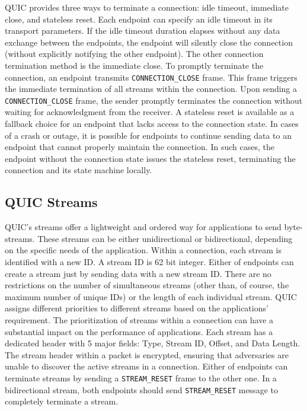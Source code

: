 QUIC provides three ways to terminate a connection: idle timeout, immediate close, and stateless reset.
Each endpoint can specify an idle timeout in its transport parameters.
If the idle timeout duration elapses without any data exchange between the endpoints, the endpoint will silently close the connection (\ie without explicitly notifying the other endpoint). 
The other connection termination method is the immediate close. 
To promptly terminate the connection, an endpoint transmits \texttt{CONNECTION\_CLOSE} frame. 
This frame triggers the immediate termination of all streams within the connection.
Upon sending a \texttt{CONNECTION\_CLOSE} frame, the sender promptly terminates the connection without waiting for acknowledgment from the receiver.
A stateless reset is available as a fallback choice for an endpoint that lacks access to the connection state.
In cases of a crash or outage, it is possible for endpoints to continue sending data to an endpoint that cannot properly maintain the connection.
In such cases, the endpoint without the connection state issues the stateless reset, terminating the connection and its state machine locally.




\subsection{QUIC Streams}
QUIC's streams offer a lightweight and ordered way for applications to send byte-streams.
These streams can be either unidirectional or bidirectional, depending on the specific needs of the application.
Within a connection, each stream is identified with a new ID.
A stream ID is 62 bit integer.
Either of endpoints can create a stream just by sending data with a new stream ID. 
There are no restrictions on the number of simultaneous streams (other than, of course, the maximum number of unique IDs) or the length of each individual stream.
QUIC assigns different priorities to different streams based on the applications' requirement.
The prioritization of streams within a connection can have a substantial impact on the performance of applications.
Each stream has a dedicated header with 5 major fields: Type, Stream ID, Offset, and Data Length.
The stream header within a packet is encrypted, ensuring that adversaries are unable to discover the active streams in a connection.
Either of endpoints can terminate streams by sending a \texttt{STREAM\_RESET} frame to the other one.
In a bidirectional stream, both endpoints should send \texttt{STREAM\_RESET} message to completely terminate a stream.

